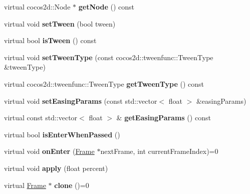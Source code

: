 \begin{DoxyCompactItemize}
\item 
\mbox{\label{classFrame_a5556e5414edf43d29a5b50e07cfa7fbf}} 
virtual cocos2d\+::\+Node $\ast$ {\bfseries get\+Node} () const
\item 
\mbox{\label{classFrame_a7e53fcdd7916ae2e8eec820c49734593}} 
virtual void {\bfseries set\+Tween} (bool tween)
\item 
\mbox{\label{classFrame_a65760eff8f5bfb02345d4fa12c1dad6e}} 
virtual bool {\bfseries is\+Tween} () const
\item 
\mbox{\label{classFrame_a513f0deccaaee9745f5f4e99cf587dff}} 
virtual void {\bfseries set\+Tween\+Type} (const cocos2d\+::tweenfunc\+::\+Tween\+Type \&tween\+Type)
\item 
\mbox{\label{classFrame_a987c9ebe3f572027845925c6eee1c355}} 
virtual cocos2d\+::tweenfunc\+::\+Tween\+Type {\bfseries get\+Tween\+Type} () const
\item 
\mbox{\label{classFrame_a8cb36c8dae7229435e889d752c5eaad4}} 
virtual void {\bfseries set\+Easing\+Params} (const std\+::vector$<$ float $>$ \&easing\+Params)
\item 
\mbox{\label{classFrame_a5f3f7c766468001dd47605f3eb408408}} 
virtual const std\+::vector$<$ float $>$ \& {\bfseries get\+Easing\+Params} () const
\item 
\mbox{\label{classFrame_a0e51cf62fe94185954ee041cc8d0f951}} 
virtual bool {\bfseries is\+Enter\+When\+Passed} ()
\item 
\mbox{\label{classFrame_a9cb6f0a1c83ddd14aceedeaedb2ec741}} 
virtual void {\bfseries on\+Enter} (\hyperlink{classFrame}{Frame} $\ast$next\+Frame, int current\+Frame\+Index)=0
\item 
\mbox{\label{classFrame_a7a31a1e1de0f283028bfaeed90d192b3}} 
virtual void {\bfseries apply} (float percent)
\item 
\mbox{\label{classFrame_a4638ff6fc9bdd1985673ac5207ac61cb}} 
virtual \hyperlink{classFrame}{Frame} $\ast$ {\bfseries clone} ()=0
\end{DoxyCompactItemize}
